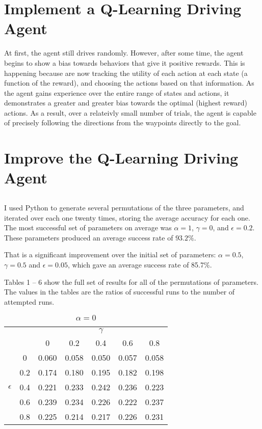\documentclass[12pt]{article}
\begin{document}
\section{Implement a Q-Learning Driving Agent}
At first, the agent still drives randomly.
However, after some time, the agent begins to show a bias towards behaviors that give it positive rewards. 
This is happening because are now tracking the utility of each action at each state (a function of the reward), and choosing the actions based on that information.
As the agent gains experience over the entire range of states and actions, it demonstrates a greater and greater bias towards the optimal (highest reward) actions.
As a result, over a relateivly small number of trials, the agent is capable of precisely following the directions from the waypoints directly to the goal.


\section{Improve the Q-Learning Driving Agent}
\subsection{}
I used Python to generate several permutations of the three parameters, and iterated over each one twenty times, storing the average accuracy for each one.
The most successful set of parameters on average was $\alpha = 1$, $\gamma = 0$, and $\epsilon = 0.2$.
These parameters produced an average success rate of $93.2\%$.

That is a significant improvement over the initial set of parameters: $\alpha = 0.5$, $\gamma = 0.5$ and $\epsilon = 0.05$, which gave an average success rate of 85.7\%.

Tables 1 -- 6 show the full set of results for all of the permutations of parameters. The values in the tables are the ratios of successful runs to the number of attempted runs.

\vspace{2ex}
\begin{table}[]
\centering
\caption{$\alpha = 0$}
\label{}
\begin{tabular}{|cc|ccccc|}
\hline
            &     &        &       & $\gamma$ &         &          \\ %
            &     & 0      & 0.2   & 0.4      & 0.6     & 0.8      \\ \hline
            & 0   & 0.060  & 0.058 & 0.050    & 0.057   & 0.058    \\ %
            & 0.2 & 0.174  & 0.180 & 0.195    & 0.182   & 0.198    \\ %
 $\epsilon$ & 0.4 & 0.221  & 0.233 & 0.242    & 0.236   & 0.223    \\ %
            & 0.6 & 0.239  & 0.234 & 0.226    & 0.222   & 0.237    \\ %
            & 0.8 & 0.225  & 0.214 & 0.217    & 0.226   & 0.231    \\ \hline
\end{tabular}
\end{table}
\end{document}
